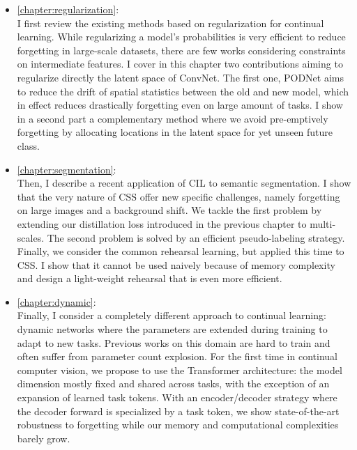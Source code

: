 \begin{itemize}
      \item \autoref{chapter:regularization}: \\
            I first review the existing methods based on regularization for continual learning. While
            regularizing a model's probabilities is very efficient to reduce forgetting in large-scale
            datasets, there are few works considering constraints on intermediate features. I cover in this
            chapter two contributions aiming to regularize directly the latent space of \acs{ConvNet}. The
            first one, \acf{PODNet} aims to reduce the drift of spatial statistics between the old and new
            model, which in effect reduces drastically forgetting even on large amount of tasks. I show in a
            second part a complementary method where we avoid pre-emptively forgetting by allocating
            locations in the latent space for yet unseen future class.
      \item \autoref{chapter:segmentation}: \\
            Then, I describe a recent application of \acf{CIL} to semantic segmentation. I show that
            the very nature of \acf{CSS} offer new specific challenges, namely forgetting on large
            images and a background shift. We tackle the first problem by extending our distillation
            loss introduced in the previous chapter to multi-scales. The second problem is solved by
            an efficient pseudo-labeling strategy. Finally, we consider the common rehearsal learning,
            but applied this time to \ac{CSS}. I show that it cannot be used naively because of memory
            complexity and design a light-weight rehearsal that is even more efficient.
      \item \autoref{chapter:dynamic}: \\
            Finally, I consider a completely different approach to continual learning: dynamic networks
            where the parameters are extended during training to adapt to new tasks. Previous works on
            this domain are hard to train and often suffer from parameter count explosion. For the
            first time in continual computer vision, we propose to use the Transformer architecture:
            the model dimension mostly fixed and shared across tasks, with the exception of an
            expansion of learned task tokens. With an encoder/decoder strategy where the decoder
            forward is specialized by a task token, we show state-of-the-art robustness to forgetting
            while our memory and computational complexities barely grow.
\end{itemize}

